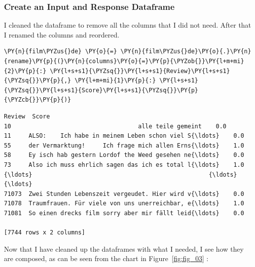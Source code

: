 \subsubsection{Create an Input and Response Dataframe}
I cleaned the dataframe to remove all the columns that I did not need.
After that I renamed the columns and reordered.
    \begin{tcolorbox}[breakable, size=fbox, boxrule=1pt, pad at break*=1mm,colback=cellbackground, colframe=cellborder]
\begin{Verbatim}[commandchars=\\\{\},fontsize=\small]
\PY{n}{film\PYZus{}de} \PY{o}{=} \PY{n}{film\PYZus{}de}\PY{o}{.}\PY{n}{rename}\PY{p}{(}\PY{n}{columns}\PY{o}{=}\PY{p}{\PYZob{}}\PY{l+m+mi}{2}\PY{p}{:} \PY{l+s+s1}{\PYZsq{}}\PY{l+s+s1}{Review}\PY{l+s+s1}{\PYZsq{}}\PY{p}{,} \PY{l+m+mi}{1}\PY{p}{:} \PY{l+s+s1}{\PYZsq{}}\PY{l+s+s1}{Score}\PY{l+s+s1}{\PYZsq{}}\PY{p}{\PYZcb{}}\PY{p}{)}
\end{Verbatim}
\end{tcolorbox}

            \begin{tcolorbox}[breakable, size=fbox, boxrule=.5pt, pad at break*=1mm, opacityfill=0]
\begin{Verbatim}[commandchars=\\\{\},fontsize=\footnotesize]
                                                  Review  Score
10                                    alle teile gemeint    0.0
11     ALSO:    Ich habe in meinem Leben schon viel S{\ldots}    0.0
55     der Vermarktung!     Ich frage mich allen Erns{\ldots}    1.0
58     Ey isch hab gestern Lordof the Weed gesehen ne{\ldots}    0.0
73     Also ich muss ehrlich sagen das ich es total l{\ldots}    1.0
{\ldots}                                                  {\ldots}    {\ldots}
71073  Zwei Stunden Lebenszeit vergeudet. Hier wird v{\ldots}    0.0
71078  Traumfrauen. Für viele von uns unerreichbar, e{\ldots}    1.0
71081  So einen drecks film sorry aber mir fällt leid{\ldots}    0.0

[7744 rows x 2 columns]
\end{Verbatim}
\end{tcolorbox}

Now that I have cleaned up the dataframes with what I needed, I see how they are composed, as can be seen from the chart in Figure~\ref{fig:fig_03} :

